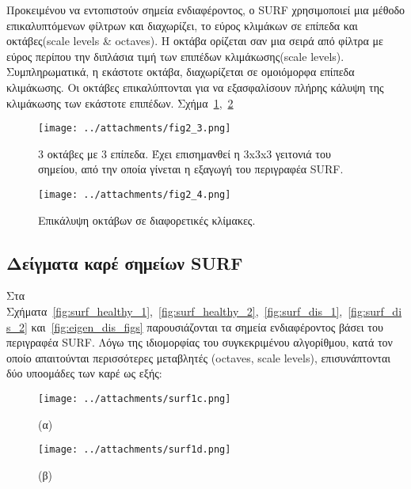 Προκειμένου να εντοπιστούν σημεία ενδιαφέροντος, ο SURF χρησιμοποιεί μια μέθοδο επικαλυπτόμενων φίλτρων και διαχωρίζει, το εύρος κλιμάκων σε επίπεδα και οκτάβες(scale levels \& octaves). 
H οκτάβα ορίζεται σαν μια σειρά από φίλτρα με εύρος περίπου την διπλάσια τιμή των επιπέδων κλιμάκωσης(scale levels).
Συμπληρωματικά, η εκάστοτε οκτάβα, διαχωρίζεται σε ομοιόμορφα επίπεδα κλιμάκωσης.
Οι οκτάβες επικαλύπτονται για να εξασφαλίσουν πλήρης κάλυψη της κλιμάκωσης των εκάστοτε επιπέδων. Σχήμα~\ref{fig:surf_figure2},~\ref{fig:surf_figure3}

\begin{figure}[ht]

\advance{}
       \texttt{[image: ../attachments/fig2\_3.png]}
                \caption{3 οκτάβες με  3 επίπεδα. Έχει επισημανθεί η 3x3x3 γειτονιά του σημείου,
                από την οποία γίνεται η εξαγωγή του περιγραφέα SURF.}
                
\label{fig:surf_figure2}      
\end{figure}



\begin{figure}[h!]
\begin{minipage}[b]{1.0\linewidth}

 \centering
\texttt{[image: ../attachments/fig2\_4.png]}
\caption{Επικάλυψη οκτάβων σε διαφορετικές κλίμακες.}
\label{fig:surf_figure3} 

\end{minipage}
\end{figure}




\newpage


\subsection{Δείγματα καρέ σημείων SURF}

Στα Σχήματα~\ref{fig:surf_healthy_1},~\ref{fig:surf_healthy_2},~\ref{fig:surf_dis_1},~\ref{fig:surf_dis_2} και~\ref{fig:eigen_dis_figs} παρουσιάζονται τα σημεία ενδιαφέροντος βάσει του περιγραφέα SURF. 
Λόγω της ιδιομορφίας του συγκεκριμένου αλγορίθμου, κατά τον οποίο απαιτούνται
περισσότερες  μεταβλητές (octaves, scale levels), επισυνάπτονται δύο υποομάδες των καρέ ως εξής:
 
\begin{figure}[h!]
\begin{minipage}[b]{0.4\linewidth}
\centering
\texttt{[image: ../attachments/surf1c.png]}
\caption*{(α)}
\label{fig:surf_1}
\end{minipage}
\hspace{0.9cm}
\begin{minipage}[b]{0.7\linewidth}
\centering
\texttt{[image: ../attachments/surf1d.png]}
\caption*{(β)}
\label{fig:surf_2}
\end{minipage}
\end{figure}



